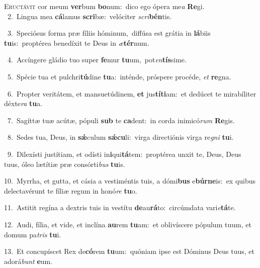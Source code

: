 \lettrine{\initial\textcolor{\initialcolor}{E}}{ructávit} cor meum \textbf{ver}\-bum \textbf{bo}\-num:~\star dico ego ópera me\textit{a} \textbf{Re}\-gi.\\
{\numbfont\textcolor{\numbcolor}{~2.}}~Lingua mea \textbf{cá}\-lamus \textbf{scri}\-bæ:~\star velóciter \textit{scri}\-\textbf{bén}tis.\par
{\numbfont\textcolor{\numbcolor}{~3.}}~Speciósus forma præ fíliis hóminum,~\dagger diffúsa est grátia in \textbf{lá}\-biis \textbf{tu}\-is:~\star proptérea benedíxit te Deus in \textit{æ}\-\textbf{tér}num.\par
{\numbfont\textcolor{\numbcolor}{~4.}}~Accíngere gládio tuo super \textbf{fe}\-mur \textbf{tu}\-um,~\star pot\-\textit{en}\-\textbf{tís}sime.\par
{\numbfont\textcolor{\numbcolor}{~5.}}~Spécie tua et pulchri\-\textbf{tú}\-dine \textbf{tu}\-a:~\star inténde, próspere procéde, \textit{et} \textbf{re}\-gna.\par
{\numbfont\textcolor{\numbcolor}{~6.}}~Propter veritátem, et mansuetúdinem, \textbf{et} jus\-\textbf{tí}\-\textbf{ti}am:~\star et dedúcet te mirabíliter déxte\textit{ra} \textbf{tu}\-a.\par
{\numbfont\textcolor{\numbcolor}{~7.}}~Sagíttæ tuæ acútæ, pópuli \textbf{sub} te \textbf{ca}\-dent:~\star in corda inimicó\textit{rum} \textbf{Re}\-gis.\par
{\numbfont\textcolor{\numbcolor}{~8.}}~Sedes tua, Deus, in \textbf{sǽ}\-culum \textbf{sǽ}\-\textbf{cu}li:~\star virga directiónis virga re\textit{gni} \textbf{tu}\-i.\par
{\numbfont\textcolor{\numbcolor}{~9.}}~Dilexísti justítiam, et odísti in\-\textbf{i}\-qui\-\textbf{tá}\-tem:~\star proptérea unxit te, Deus, Deus tuus, óleo lætítiæ præ consórti\textit{bus} \textbf{tu}\-is.\par
{\numbfont\textcolor{\numbcolor}{10.}}~Myrrha, et gutta, et cásia a vestiméntis tuis, a dómi\textbf{bus} e\-\textbf{búr}\-\textbf{ne}is:~\star ex quibus delectavérunt te fíliæ regum in honó\textit{re} \textbf{tu}\-o.\par
{\numbfont\textcolor{\numbcolor}{11.}}~Astitit regína a dextris tuis in vestítu \textbf{de}\-au\-\textbf{rá}\-to:~\star circúmdata vari\-\textit{e}\-\textbf{tá}te.\par
{\numbfont\textcolor{\numbcolor}{12.}}~Audi, fília, et vide, et inclína \textbf{au}\-rem \textbf{tu}\-am:~\star et oblivíscere pópulum tuum, et domum pa\textit{tris} \textbf{tu}\-i.\par
{\numbfont\textcolor{\numbcolor}{13.}}~Et concupíscet Rex de\-\textbf{có}\-rem \textbf{tu}\-um:~\star quóniam ipse est Dóminus Deus tuus, et adorá\textit{bunt} \textbf{e}\-um.\par
